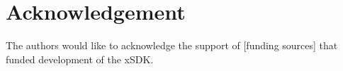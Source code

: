 \chapter*{Acknowledgement}
The authors would like to acknowledge the support of [funding sources] that
funded development of the xSDK.